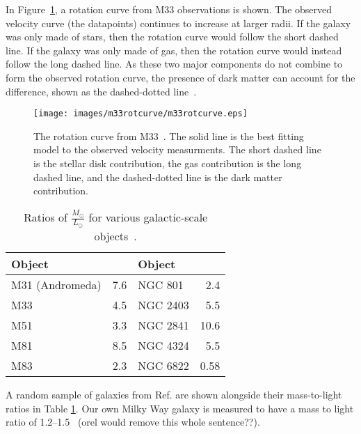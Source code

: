 In Figure~\ref{fig:m33rotcurve}, a rotation curve from M33 observations is shown.
The observed velocity curve (the datapoints) continues to increase at larger radii.
If the galaxy was only made of stars, then the rotation curve would follow the short dashed line.
If the galaxy was only made of gas, then the rotation curve would instead follow the long dashed line.
As these two major components do not combine to form the observed rotation curve, the presence of dark matter can account for the difference, shown as the dashed-dotted line~\cite{m33rotcurve}.
    
\begin{figure}[ht]
  \texttt{[image: images/m33rotcurve/m33rotcurve.eps]}
  \caption[M33 Rotation Curve]{
    The rotation curve from M33~\cite{m33rotcurve}.
    The solid line is the best fitting model to the observed velocity measurments.
    The short dashed line is the stellar disk contribution, the gas contribution is the long dashed line, and the dashed-dotted line is the dark matter contribution.
  }
  \label{fig:m33rotcurve}
\end{figure}

\begin{table}[]
  \centering
  \caption[Ratios of \mlratio{} for Various Galactic-scale Objects]{Ratios of $\frac{M_\odot}{L_\odot}$ for various galactic-scale objects~\cite{faber_ml}.}
  \label{tab:mlratios}
  \begin{tabular}{l r | l r}
    Object      &  \mlratio{} & Object & \mlratio{} \\
    \hline
    M31 (Andromeda) &  7.6  & NGC 801  &  2.4  \\
    M33             &  4.5  & NGC 2403 &  5.5  \\
    M51             &  3.3  & NGC 2841 & 10.6  \\
    M81             &  8.5  & NGC 4324 &  5.5  \\
    M83             &  2.3  & NGC 6822 &  0.58 \\
  \end{tabular}
\end{table}
      
A random sample of galaxies from Ref. \cite{faber_ml} are shown alongside their mass-to-light ratios in Table \ref{tab:mlratios}.
Our own Milky Way galaxy is measured to have a mass to light ratio of \SIrange{1.2}{1.5}{}~\cite{milkyway_ml_ratio} {\color{red}(orel would remove this whole sentence??)}.

